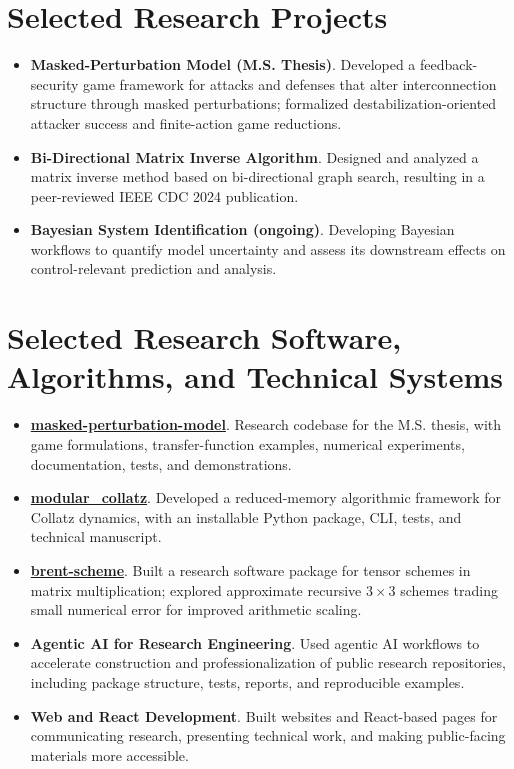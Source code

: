 \documentclass[10pt,letterpaper]{article}
\newcommand{\project}[2]{%
  \textbf{#1}. #2
}
\newcommand{\cvlink}[2]{\href{#1}{#2}}
\begin{document}
\section{Selected Research Projects}
\begin{itemize}
    \item \project{Masked-Perturbation Model (M.S. Thesis)}{Developed a feedback-security game framework for attacks and defenses that alter interconnection structure through masked perturbations; formalized destabilization-oriented attacker success and finite-action game reductions.}
    \item \project{Bi-Directional Matrix Inverse Algorithm}{Designed and analyzed a matrix inverse method based on bi-directional graph search, resulting in a peer-reviewed IEEE CDC 2024 publication.}
    \item \project{Bayesian System Identification (ongoing)}{Developing Bayesian workflows to quantify model uncertainty and assess its downstream effects on control-relevant prediction and analysis.}
\end{itemize}

\section{Selected Research Software, Algorithms, and Technical Systems}
\begin{itemize}
    \item \project{\cvlink{https://github.com/perryGabriel/masked-perturbation-model}{masked-perturbation-model}}{Research codebase for the M.S. thesis, with game formulations, transfer-function examples, numerical experiments, documentation, tests, and demonstrations.}
    \item \project{\cvlink{https://github.com/perryGabriel/modular_collatz}{modular\_collatz}}{Developed a reduced-memory algorithmic framework for Collatz dynamics, with an installable Python package, CLI, tests, and technical manuscript.}
    \item \project{\cvlink{https://github.com/perryGabriel/brent-scheme}{brent-scheme}}{Built a research software package for tensor schemes in matrix multiplication; explored approximate recursive $3\times3$ schemes trading small numerical error for improved arithmetic scaling.}
    \item \project{Agentic AI for Research Engineering}{Used agentic AI workflows to accelerate construction and professionalization of public research repositories, including package structure, tests, reports, and reproducible examples.}
    \item \project{Web and React Development}{Built websites and React-based pages for communicating research, presenting technical work, and making public-facing materials more accessible.}
\end{itemize}
\end{document}
